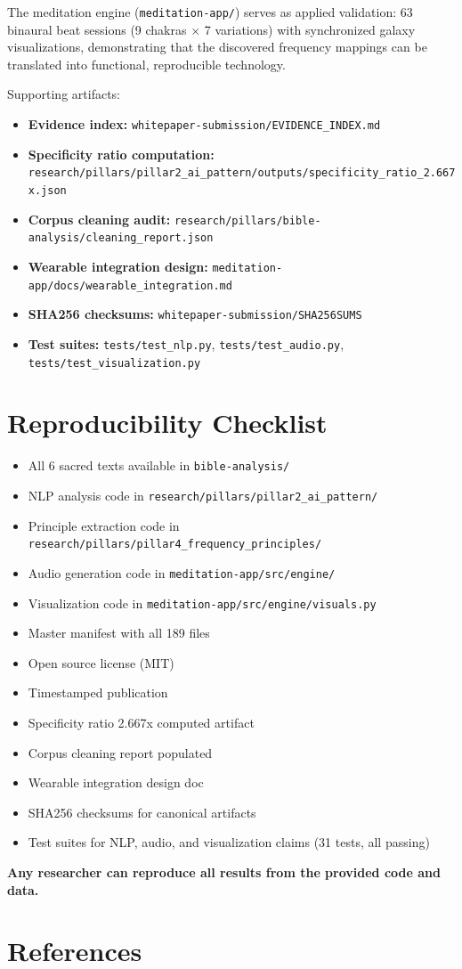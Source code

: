 \documentclass[11pt]{article}
\begin{document}
The meditation engine (\texttt{meditation-app/}) serves as applied validation: 63 binaural beat sessions (9 chakras $\times$ 7 variations) with synchronized galaxy visualizations, demonstrating that the discovered frequency mappings can be translated into functional, reproducible technology.

Supporting artifacts:
\begin{itemize}
    \item \textbf{Evidence index:} \texttt{whitepaper-submission/EVIDENCE_INDEX.md}
    \item \textbf{Specificity ratio computation:} \texttt{research/pillars/pillar2_ai_pattern/outputs/specificity\_ratio\_2.667x.json}
    \item \textbf{Corpus cleaning audit:} \texttt{research/pillars/bible-analysis/cleaning\_report.json}
    \item \textbf{Wearable integration design:} \texttt{meditation-app/docs/wearable\_integration.md}
    \item \textbf{SHA256 checksums:} \texttt{whitepaper-submission/SHA256SUMS}
    \item \textbf{Test suites:} \texttt{tests/test\_nlp.py}, \texttt{tests/test\_audio.py}, \texttt{tests/test\_visualization.py}
\end{itemize}

\section{Reproducibility Checklist}

\begin{itemize}
    \item[$\boxtimes$] All 6 sacred texts available in \texttt{bible-analysis/}
    \item[$\boxtimes$] NLP analysis code in \texttt{research/pillars/pillar2\_ai\_pattern/}
    \item[$\boxtimes$] Principle extraction code in \texttt{research/pillars/pillar4\_frequency\_principles/}
    \item[$\boxtimes$] Audio generation code in \texttt{meditation-app/src/engine/}
    \item[$\boxtimes$] Visualization code in \texttt{meditation-app/src/engine/visuals.py}
    \item[$\boxtimes$] Master manifest with all 189 files
    \item[$\boxtimes$] Open source license (MIT)
    \item[$\boxtimes$] Timestamped publication
    \item[$\boxtimes$] Specificity ratio 2.667x computed artifact
    \item[$\boxtimes$] Corpus cleaning report populated
    \item[$\boxtimes$] Wearable integration design doc
    \item[$\boxtimes$] SHA256 checksums for canonical artifacts
    \item[$\boxtimes$] Test suites for NLP, audio, and visualization claims (31 tests, all passing)
\end{itemize}

\textbf{Any researcher can reproduce all results from the provided code and data.}

\section*{References}




\end{document}

